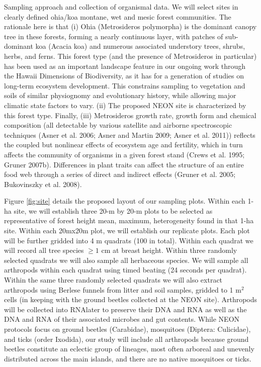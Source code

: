\documentclass[11pt]{article}
\makeatletter
\renewcommand{\paragraph}{\@startsection{paragraph}{4}{\z@}
  {1ex \@plus 1ex \@minus .2ex}{-1em}
  {\normalfont\normalsize\it}
}
\makeatother
\begin{document}
\paragraph{Sampling approach and collection of organismal data.}
We will select sites in clearly defined ohia/koa montane, wet and
mesic forest communities. The rationale here is that (i) Ohia
(Metrosideros polymorpha) is the dominant canopy tree in these
forests, forming a nearly continuous layer, with patches of
sub-dominant koa (Acacia koa) and numerous associated understory
trees, shrubs, herbs, and ferns. This forest type (and the presence of
Metrosideros in particular) has been used as an important landscape
feature in our ongoing work through the Hawaii Dimensions of
Biodiversity, as it has for a generation of studies on long-term
ecosystem development. This constrains sampling to vegetation and
soils of similar physiognomy and evolutionary history, while allowing
major climatic state factors to vary. (ii) The proposed NEON site is
characterized by this forest type. Finally, (iii) Metrosideros growth
rate, growth form and chemical composition (all detectable by various
satellite and airborne spectroscopic techniques (Asner et al. 2006;
Asner and Martin 2009; Asner et al. 2011)) reflects the coupled but
nonlinear effects of ecosystem age and fertility, which in turn
affects the community of organisms in a given forest stand (Crews et
al. 1995; Gruner 2007b). Differences in plant traits can affect the
structure of an entire food web through a series of direct and
indirect effects (Gruner et al. 2005; Bukovinszky et al. 2008).

Figure \ref{fig:site} details the proposed layout of our sampling
plots. Within each 1-ha site, we will establish three 20-m by 20-m
plots to be selected as representative of forest height mean, maximum,
heterogeneity found in that 1-ha site. Within each 20mx20m plot, we
will establish our replicate plots.  Each plot will be further gridded
into 4 m quadrats (100 in total).  Within each quadrat we will record
all tree species $\geq 1$ cm at breast height.  Within three randomly
selected quadrats we will also sample all herbaceous species.  We will
sample all arthropods within each quadrat using timed beating (24
seconds per quadrat).  Within the same three randomly selected
quadrats we will also extract arthropods using Berlese funnels from
litter and soil samples, gridded to 1 m$^2$ cells (in keeping with the
ground beetles collected at the NEON site).  Arthropods will be
collected into RNAlater to preserve their DNA and RNA as well as the
DNA and RNA of their associated microbes and gut contents.  While NEON
protocols focus on ground beetles (Carabidae), mosquitoes (Diptera:
Culicidae), and ticks (order Ixodida), our study will include all
arthropods because ground beetles constitute an eclectic group of
lineages, most often arboreal and unevenly distributed across the main
islands, and there are no native mosquitoes or ticks.
\end{document}
